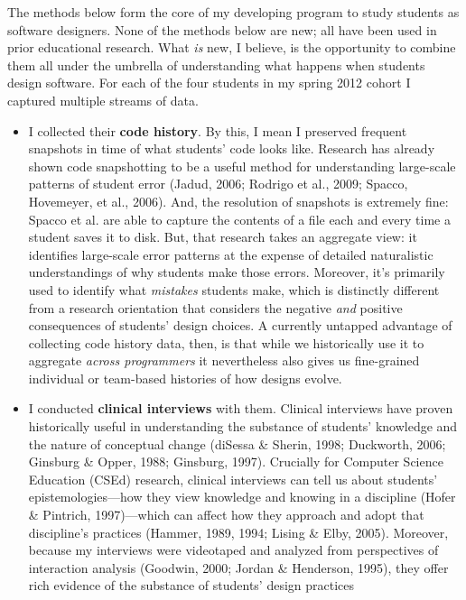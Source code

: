 The methods below form the core of my developing program to study
students as software designers. None of the methods below are new; all
have been used in prior educational research. What \emph{is} new, I
believe, is the opportunity to combine them all under the umbrella of
understanding what happens when students design software. For each of
the four students in my spring 2012 cohort I captured multiple streams
of data.

\begin{itemize}
\item
  I collected their \textbf{code history}. By this, I mean I preserved
  frequent snapshots in time of what students' code looks like. Research
  has already shown code snapshotting to be a useful method for
  understanding large-scale patterns of student error (Jadud, 2006;
  Rodrigo et al., 2009; Spacco, Hovemeyer, et al., 2006). And, the
  resolution of snapshots is extremely fine: Spacco et al. are able to
  capture the contents of a file each and every time a student saves it
  to disk. But, that research takes an aggregate view: it identifies
  large-scale error patterns at the expense of detailed naturalistic
  understandings of why students make those errors. Moreover, it's
  primarily used to identify what \emph{mistakes} students make, which
  is distinctly different from a research orientation that considers the
  negative \emph{and} positive consequences of students' design choices.
  A currently untapped advantage of collecting code history data, then,
  is that while we historically use it to aggregate \emph{across
  programmers} it nevertheless also gives us fine-grained individual or
  team-based histories of how designs evolve.
\item
  I conducted \textbf{clinical interviews} with them. Clinical
  interviews have proven historically useful in understanding the
  substance of students' knowledge and the nature of conceptual change
  (diSessa \& Sherin, 1998; Duckworth, 2006; Ginsburg \& Opper, 1988;
  Ginsburg, 1997). Crucially for Computer Science Education (CSEd)
  research, clinical interviews can tell us about students'
  epistemologies---how they view knowledge and knowing in a discipline
  (Hofer \& Pintrich, 1997)---which can affect how they approach and
  adopt that discipline's practices (Hammer, 1989, 1994; Lising \& Elby,
  2005). Moreover, because my interviews were videotaped and analyzed
  from perspectives of interaction analysis (Goodwin, 2000; Jordan \&
  Henderson, 1995), they offer rich evidence of the substance of
  students' design practices

\end{itemize}
